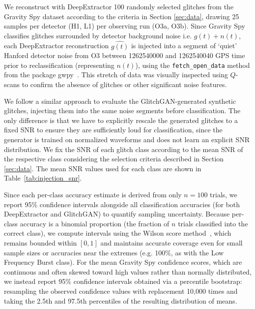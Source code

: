 \documentclass[reprint,nofootinbib,amsmath,amssymb,aps,floatfix]{revtex4-2}
\begin{document}
We reconstruct with DeepExtractor 100 randomly selected glitches from the Gravity Spy dataset according to the criteria in Section \ref{sec:data}, drawing 25 samples per detector (H1, L1) per observing run (O3a, O3b).
Since Gravity Spy classifies glitches surrounded by detector background noise i.e. $g(t) + n(t)$, each DeepExtractor reconstruction $\hat{g(t)}$ is injected into a segment of `quiet' Hanford detector noise from O3 between 1262540000 and 1262540040 GPS time prior to reclassification (representing $n(t)$), using the \texttt{fetch\_open\_data} method from the package gwpy~\cite{gwpy}.
This stretch of data was visually inspected using $Q$-scans to confirm the absence of glitches or other significant noise features.


We follow a similar approach to evaluate the GlitchGAN-generated synthetic glitches, injecting them into the same noise segments before classification. 
The only difference is that we have to explicitly rescale the generated glitches to a fixed SNR to ensure they are sufficiently loud for classification, since the generator is trained on normalized waveforms and does not learn an explicit SNR distribution. 
We fix the SNR of each glitch class according to the mean SNR of the respective class considering the selection criteria described in Section \ref{sec:data}.
The mean SNR values used for each class are shown in Table~\ref{tab:injection_snr}.

Since each per-class accuracy estimate is derived from only $n=100$ trials, we report 95\% confidence intervals alongside all classification accuracies (for both DeepExtractor and GlitchGAN) to quantify sampling uncertainty. 
Because per-class accuracy is a binomial proportion (the fraction of $n$ trials classified into the correct class), we compute intervals using the Wilson score method~\cite{Wilson01061927}, which remains bounded within $[0,1]$ and maintains accurate coverage even for small sample sizes or accuracies near the extremes (e.g. 100\%, as with the Low Frequency Burst class). 
For the mean Gravity Spy confidence scores, which are continuous and often skewed toward high values rather than normally distributed, we instead report 95\% confidence intervals obtained via a percentile bootstrap: resampling the observed confidence values with replacement 10{,}000 times and taking the 2.5th and 97.5th percentiles of the resulting distribution of means.
\end{document}
